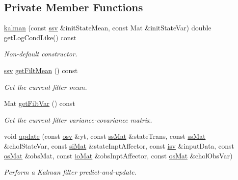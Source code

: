 \subsection*{Private Member Functions}
\begin{DoxyCompactItemize}
\item 
\hyperlink{classpf_1_1kalman_a14f7c39ebc7d06f703a9cb08ae7c1c50}{kalman} (const \hyperlink{classpf_1_1kalman_a5b389e6a5e41f4ad81d4ba115d9aa823}{ssv} \&init\+State\+Mean, const Mat \&init\+State\+Var) double get\+Log\+Cond\+Like() const 
\begin{DoxyCompactList}\small\item\em Non-\/default constructor. \end{DoxyCompactList}\item 
\hyperlink{classpf_1_1kalman_a5b389e6a5e41f4ad81d4ba115d9aa823}{ssv} \hyperlink{classpf_1_1kalman_aeede6326045fa762468cdb9f24d4c22a}{get\+Filt\+Mean} () const 
\begin{DoxyCompactList}\small\item\em Get the current filter mean. \end{DoxyCompactList}\item 
Mat \hyperlink{classpf_1_1kalman_a1c969734ffe8ea15dcfdc440cc2e1181}{get\+Filt\+Var} () const 
\begin{DoxyCompactList}\small\item\em Get the current filter variance-\/covariance matrix. \end{DoxyCompactList}\item 
void \hyperlink{classpf_1_1kalman_a081bf6466cc9d19e72ef50cf1ca4bc00}{update} (const \hyperlink{classpf_1_1kalman_a0568355548ed0e2cae065b489b2428c1}{osv} \&yt, const \hyperlink{classpf_1_1kalman_aff9ecb9b57dfc3f115a372a765781561}{ss\+Mat} \&state\+Trans, const \hyperlink{classpf_1_1kalman_aff9ecb9b57dfc3f115a372a765781561}{ss\+Mat} \&chol\+State\+Var, const \hyperlink{classpf_1_1kalman_afc940e82542b4dcce4a0834297d98781}{si\+Mat} \&state\+Inpt\+Affector, const \hyperlink{classpf_1_1kalman_a6cbcd532087d0b69bcf1825d8d4ac25a}{isv} \&input\+Data, const \hyperlink{classpf_1_1kalman_a41a83764417fa43c3eb0898676791efa}{os\+Mat} \&obs\+Mat, const \hyperlink{classpf_1_1kalman_a1bef1b09ec25689b765bb57bf1bbbfd6}{io\+Mat} \&obs\+Inpt\+Affector, const \hyperlink{classpf_1_1kalman_a41a83764417fa43c3eb0898676791efa}{os\+Mat} \&chol\+Obs\+Var)
\begin{DoxyCompactList}\small\item\em Perform a Kalman filter predict-\/and-\/update. \end{DoxyCompactList}\item 

\end{DoxyCompactItemize}
